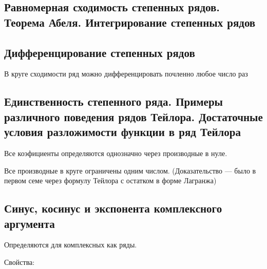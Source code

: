 \documentclass[12pt, a4paper, oneside]{memoir}
\begin{document}
\subsection{Равномерная сходимость степенных рядов. Теорема Абеля. Интегрирование степенных рядов}
\subsection{Дифференцирование степенных рядов}

\begin{theorem}

    В круге сходимости ряд можно дифференцировать почленно любое число раз
\end{theorem}

\subsection{Единственность степенного ряда. Примеры различного поведения рядов Тейлора. Достаточные условия разложимости функции в ряд Тейлора}

\begin{theorem}

    Все коэфициенты определяются однозначно через производные в нуле.
\end{theorem}

\begin{theorem}

    Все производные в круге ограничены одним числом. (Доказательство — было в первом семе через формулу Тейлора с остатком в форме Лагранжа)
\end{theorem}




\subsection{Синус, косинус и экспонента комплексного аргумента}

Определяются для комплексных как ряды.

Свойства:
\end{document}
